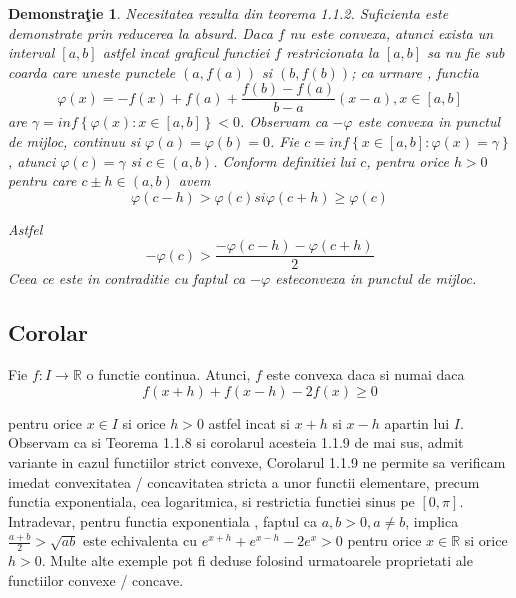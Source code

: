 \documentclass[a4paper,12pt,oneside]{report}
\newtheorem{demonstration}{Demonstra\c tie}
\begin{document}
\begin{demonstration}
Necesitatea rezulta din teorema 1.1.2. Suficienta este demonstrate prin reducerea la absurd. Daca \(f\) nu este convexa, atunci exista un interval \(\left [ a,b \right ]\) astfel incat graficul functiei \(f\) restricionata la  \(\left [ a,b \right ]\) sa nu fie sub coarda care uneste punctele \(\left ( a, f\left ( a \right ) \right )\) si \(\left ( b, f\left ( b \right ) \right )\); ca urmare , functia
\begin{displaymath}
  \varphi \left ( x \right )= -f\left ( x \right ) + f\left ( a \right )+ \frac{f\left ( b \right )- f\left ( a \right )}{b-a}\left ( x-a \right ), x\in \left [ a,b \right ]
\end{displaymath}
are  \(\gamma = inf \left \{ \varphi \left ( x \right ) : x\in \left [ a,b \right ]\right \}< 0\). Observam ca \(-\varphi\) este convexa in punctul de mijloc, continuu si \(\varphi \left ( a \right ) =\varphi \left ( b \right ) = 0\). Fie \(c = inf \left \{ x \in \left [ a,b  \right ] : \varphi \left ( x \right )= \gamma \right \} \), atunci \(\varphi \left ( c \right ) = \gamma\)  si \(c \in \left ( a,b  \right )\). Conform definitiei lui \(c\), pentru orice \(h>0\) pentru care \(c\pm h\in \left ( a,b \right )\) avem 
\begin{displaymath}
  \varphi \left ( c - h  \right )> \varphi \left ( c \right ) si \varphi \left ( c + h  \right )\geq  \varphi \left ( c \right )
\end{displaymath}

Astfel 
\begin{displaymath}
  -\varphi \left ( c \right )> \frac{-\varphi \left ( c-h \right )-\varphi \left ( c+h \right )}{2} 
\end{displaymath}
Ceea ce este in contraditie cu faptul ca \(-\varphi\) esteconvexa in punctul de mijloc. 
\end{demonstration}


\subsection{Corolar}

Fie \(f: I \rightarrow \mathbb{R}\) o functie continua. Atunci, \(f\) este convexa daca si numai daca
\begin{displaymath}
  f\left ( x+h \right )+ f\left ( x - h \right ) - 2f\left ( x \right )\geq 0
\end{displaymath}

pentru orice \(x \in I\) si orice \(h > 0\) astfel incat si \(x + h\) si \(x - h\) apartin lui \(I\). 
Observam ca si Teorema 1.1.8 si corolarul acesteia 1.1.9 de mai sus, admit variante in cazul functiilor strict convexe, 
Corolarul 1.1.9 ne permite sa verificam imedat convexitatea / concavitatea stricta a unor functii elementare, precum functia exponentiala, cea logaritmica, si restrictia functiei sinus pe \(\left [ 0 , \pi \right ]\). Intradevar, pentru functia exponentiala , faptul ca  \(a , b > 0, a\neq b\), implica \(\frac{a + b}{2}> \sqrt{ab}\)
este echivalenta cu 
\(e^{x + h} + e^{x - h } - 2e^{x}> 0\)
pentru orice \(x\in \mathbb{R}\) si orice \(h > 0\).
	Multe alte exemple pot fi deduse folosind urmatoarele proprietati ale functiilor convexe / concave. 
\end{document}
